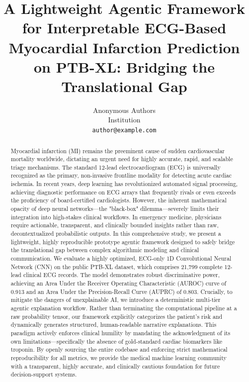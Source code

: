 \documentclass[10pt,twocolumn,letterpaper]{article}
\title{A Lightweight Agentic Framework for Interpretable ECG-Based Myocardial Infarction Prediction on PTB-XL: Bridging the Translational Gap}
\author{
Anonymous Authors\\
Institution\\
{\tt\small author@example.com}
}
\begin{document}
\maketitle

\begin{abstract}
Myocardial infarction (MI) remains the preeminent cause of sudden cardiovascular mortality worldwide, dictating an urgent need for highly accurate, rapid, and scalable triage mechanisms. The standard 12-lead electrocardiogram (ECG) is universally recognized as the primary, non-invasive frontline modality for detecting acute cardiac ischemia. In recent years, deep learning has revolutionized automated signal processing, achieving diagnostic performance on ECG arrays that frequently rivals or even exceeds the proficiency of board-certified cardiologists. However, the inherent mathematical opacity of deep neural networks—the "black-box" dilemma—severely limits their integration into high-stakes clinical workflows. In emergency medicine, physicians require actionable, transparent, and clinically bounded insights rather than raw, decontextualized probabilistic outputs. In this comprehensive study, we present a lightweight, highly reproducible prototype agentic framework designed to safely bridge the translational gap between complex algorithmic modeling and clinical communication. We evaluate a highly optimized, ECG-only 1D Convolutional Neural Network (CNN) on the public PTB-XL dataset, which comprises 21,799 complete 12-lead clinical ECG records. The model demonstrates robust discriminative power, achieving an Area Under the Receiver Operating Characteristic (AUROC) curve of 0.913 and an Area Under the Precision-Recall Curve (AUPRC) of 0.803. Crucially, to mitigate the dangers of unexplainable AI, we introduce a deterministic multi-tier agentic explanation workflow. Rather than terminating the computational pipeline at a raw probability tensor, our framework explicitly categorizes the patient's risk and dynamically generates structured, human-readable narrative explanations. This paradigm actively enforces clinical humility by mandating the acknowledgment of its own limitations—specifically the absence of gold-standard cardiac biomarkers like troponin. By openly sourcing the entire codebase and enforcing strict mathematical reproducibility for all metrics, we provide the medical machine learning community with a transparent, highly accurate, and clinically cautious foundation for future decision-support systems.
\end{abstract}
\end{document}
